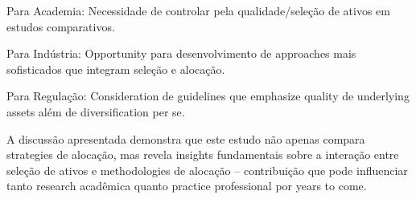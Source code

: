 Para Academia: Necessidade de controlar pela qualidade/seleção de ativos em estudos comparativos.

Para Indústria: Opportunity para desenvolvimento de approaches mais sofisticados que integram seleção e alocação.

Para Regulação: Consideration de guidelines que emphasize quality de underlying assets além de diversification per se.

A discussão apresentada demonstra que este estudo não apenas compara strategies de alocação, mas revela insights fundamentais sobre a interação entre seleção de ativos e methodologies de alocação – contribuição que pode influenciar tanto research acadêmica quanto practice professional por years to come.